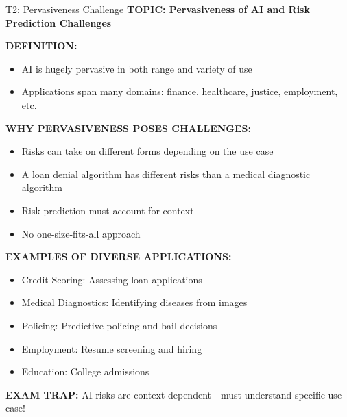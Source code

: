 \documentclass[8pt]{beamer}
\begin{document}
	\begin{frame}{T2: Pervasiveness Challenge}
		\fontsize{6.5}{7.5}\selectfont
		\textbf{TOPIC: Pervasiveness of AI and Risk Prediction Challenges}
		
		\vspace{0.1cm}
		\textbf{DEFINITION:}
		\begin{itemize}
			\item AI is hugely pervasive in both range and variety of use
			\item Applications span many domains: finance, healthcare, justice, employment, etc.
		\end{itemize}
		
		\vspace{0.1cm}
		\textbf{WHY PERVASIVENESS POSES CHALLENGES:}
		\begin{itemize}
			\item Risks can take on different forms depending on the use case
			\item A loan denial algorithm has different risks than a medical diagnostic algorithm
			\item Risk prediction must account for context
			\item No one-size-fits-all approach
		\end{itemize}
		
		\vspace{0.1cm}
		\textbf{EXAMPLES OF DIVERSE APPLICATIONS:}
		\begin{itemize}
			\item \textcolor{myblue}{Credit Scoring:} Assessing loan applications
			\item \textcolor{myblue}{Medical Diagnostics:} Identifying diseases from images
			\item \textcolor{myblue}{Policing:} Predictive policing and bail decisions
			\item \textcolor{myblue}{Employment:} Resume screening and hiring
			\item \textcolor{myblue}{Education:} College admissions
		\end{itemize}
		
		\textcolor{myred}{\textbf{EXAM TRAP:}} AI risks are \textcolor{myblue}{context-dependent} - must understand specific use case!
	\end{frame}
	
\end{document}
